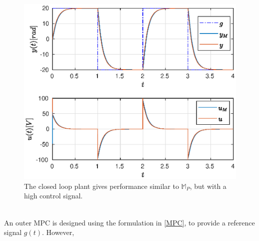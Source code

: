 \documentclass[letterpaper, 10 pt, conference]{ieeeconf}  %
\begin{document}
\begin{enumerate}
	\vspace{-13pt}
	\begin{figure}[h]
		\includegraphics[scale = 0.65]{VRFT.eps}
		\caption{The closed loop plant gives performance similar to $\mathbb{M}_P$, but with a high control signal.}
		\label{VRFT}
	\end{figure} \\
	An outer MPC is designed using the formulation in \eqref{MPC}, to provide a reference signal $g(t)$. However, 
	
	
	
	
\end{enumerate} 

	
                                                              



\end{document}

